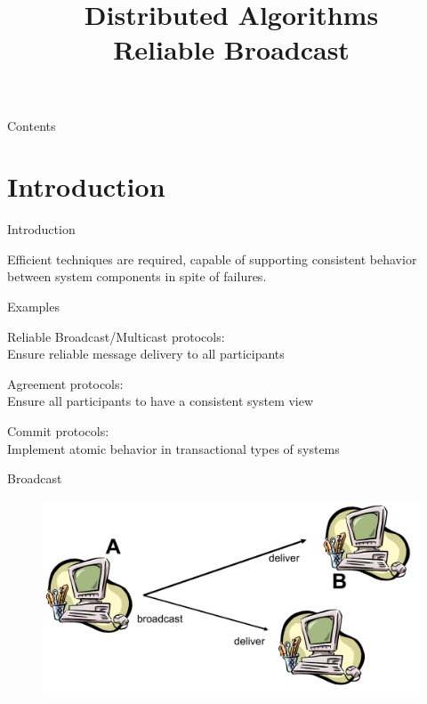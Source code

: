 
\title[DS - Reliable Broadcast]{\textbf{Distributed Algorithms}\\Reliable Broadcast}





\begin{frame}
\titlepage
\end{frame}

\begin{frame}[shrink]{Contents}
\tableofcontents
\end{frame}

\section{Introduction}

\begin{frame}{Introduction}

Efficient techniques are required, capable of supporting consistent behavior 
between system components in spite of failures.

\bigskip
\begin{block}{Examples}
\BIL
\item  \alert{Reliable Broadcast/Multicast protocols}:\\
Ensure reliable message delivery to all participants 
\item Agreement protocols:\\
Ensure all participants to have a consistent system view 
\item Commit protocols:\\
Implement atomic behavior in transactional types of systems
\EIL
\end{block}

\end{frame}

\begin{frame}{Broadcast}
	
\begin{figure}
\includegraphics[width=\textwidth]{figs/04/rb-example}
\end{figure}

\end{frame}

